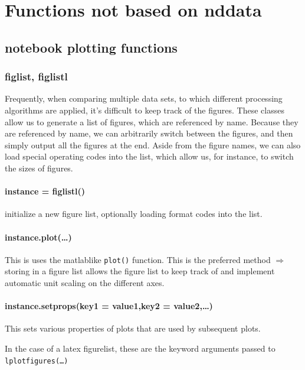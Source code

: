 \section{Functions not based on nddata}\label{sec:writeup_sofware_Pyspec_nonnddata}
\subsection{notebook plotting functions}
\subsubsection{figlist, figlistl}
Frequently, when comparing multiple data sets,
    to which different processing algorithms are applied,
    it's difficult to keep track of the figures.
These classes allow us to generate a list of figures,
    which are referenced by name.
Because they are referenced by name, we can arbitrarily
    switch between the figures,
    and then simply output all the figures at the end.
Aside from the figure names, we can also load special operating
    codes into the list, which allow us, for instance,
    to switch the sizes of figures.
    \paragraph{instance = figlistl()} initialize a new figure list,
        optionally loading format codes into the list.
    \paragraph{instance.plot(\ldots)}
    This is uses the matlablike \texttt{plot()} function.
    This is the preferred method $\Rightarrow$ storing in a figure list allows the figure list to keep track of and implement automatic unit scaling on the different axes.
    \paragraph{instance.setprops(key1 = value1,key2 = value2,\ldots)}
    This sets various properties of plots that are used by subsequent plots.

    In the case of a latex figurelist, these are the keyword arguments passed to
    \texttt{lplotfigures(\ldots)}
